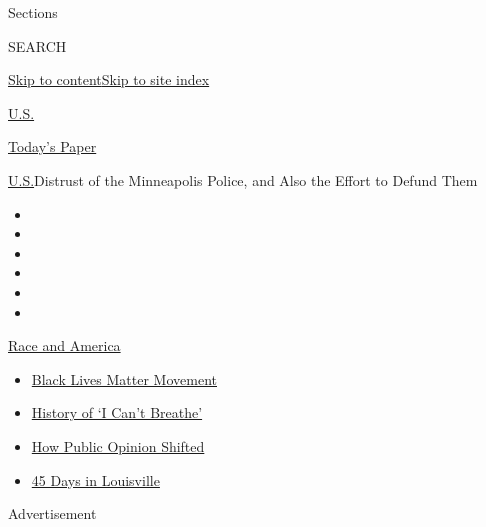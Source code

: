 Sections

SEARCH

\protect\hyperlink{site-content}{Skip to
content}\protect\hyperlink{site-index}{Skip to site index}

\href{https://www.nytimes.com/section/us}{U.S.}

\href{https://myaccount.nytimes.com/auth/login?response_type=cookie\&client_id=vi}{}

\href{https://www.nytimes.com/section/todayspaper}{Today's Paper}

\href{/section/us}{U.S.}\textbar{}Distrust of the Minneapolis Police,
and Also the Effort to Defund Them

\begin{itemize}
\item
\item
\item
\item
\item
\item
\end{itemize}

\href{https://www.nytimes.com/news-event/george-floyd-protests-minneapolis-new-york-los-angeles?action=click\&pgtype=Article\&state=default\&region=TOP_BANNER\&context=storylines_menu}{Race
and America}

\begin{itemize}
\tightlist
\item
  \href{https://www.nytimes.com/interactive/2020/07/03/us/george-floyd-protests-crowd-size.html?action=click\&pgtype=Article\&state=default\&region=TOP_BANNER\&context=storylines_menu}{Black
  Lives Matter Movement}
\item
  \href{https://www.nytimes.com/interactive/2020/06/28/us/i-cant-breathe-police-arrest.html?action=click\&pgtype=Article\&state=default\&region=TOP_BANNER\&context=storylines_menu}{History
  of `I Can't Breathe'}
\item
  \href{https://www.nytimes.com/interactive/2020/06/10/upshot/black-lives-matter-attitudes.html?action=click\&pgtype=Article\&state=default\&region=TOP_BANNER\&context=storylines_menu}{How
  Public Opinion Shifted}
\item
  \href{https://www.nytimes.com/interactive/2020/07/16/us/black-lives-matter-protests-louisville-breonna-taylor.html?action=click\&pgtype=Article\&state=default\&region=TOP_BANNER\&context=storylines_menu}{45
  Days in Louisville}
\end{itemize}

Advertisement

